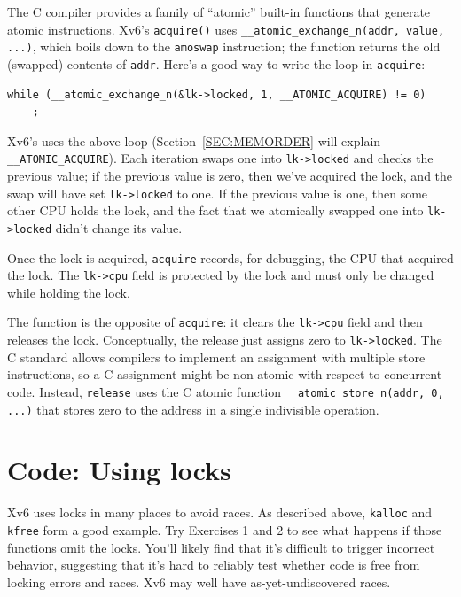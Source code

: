 The C compiler provides a family of ``atomic'' built-in functions
that generate atomic instructions. Xv6's \lstinline{acquire()}
uses \lstinline{__atomic_exchange_n(addr, value, ...)}, which boils down to
the 
\lstinline{amoswap}
instruction;
the function returns the old (swapped) contents of {\tt *addr}.
Here's a good way to write the loop in {\tt acquire}:

\begin{lstlisting}[]
  while (__atomic_exchange_n(&lk->locked, 1, __ATOMIC_ACQUIRE) != 0)
    ;
\end{lstlisting}

Xv6's 
uses the above loop (Section~\ref{SEC:MEMORDER} will explain \lstinline{__ATOMIC_ACQUIRE}).
Each iteration swaps one into
\lstinline{lk->locked} 
and checks the previous value;
if the previous value is zero, then we've acquired the
lock, and the swap will have set 
\lstinline{lk->locked}
to one.
If the previous value is one, then some other CPU
holds the lock, and the fact that we atomically swapped one into
\lstinline{lk->locked}
didn't change its value.

Once the lock is acquired,
\lstinline{acquire}
records, for debugging, the CPU 
that acquired the lock.
The
\lstinline{lk->cpu}
field is protected by the lock
and must only be changed while holding the lock.

The function
is the opposite of 
\lstinline{acquire}:
it clears the 
\lstinline{lk->cpu}
field
and then releases the lock.
Conceptually, the release just assigns zero to
\lstinline{lk->locked}.
The C standard allows compilers to implement an assignment
with multiple store instructions,
so a C assignment might be non-atomic with respect
to concurrent code.
Instead,
\lstinline{release}
uses the C atomic function
\lstinline{__atomic_store_n(addr, 0, ...)}
that stores zero to the address in a single
indivisible operation.
\section{Code: Using locks}
Xv6 uses locks in many places to avoid races.
As described above,
\lstinline{kalloc}
and
\lstinline{kfree}
form a good example.
Try Exercises 1 and 2 to see what happens if those
functions omit the locks.
You'll likely find that it's difficult to trigger incorrect
behavior, suggesting that it's hard to reliably test whether code
is free from locking errors and races.
Xv6 may well have as-yet-undiscovered races.

